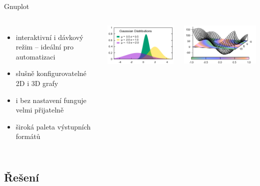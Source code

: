 \documentclass{beamer}
\begin{document}
\begin{frame}{Gnuplot}
  \begin{columns}
      \begin{itemize}
        \item interaktivní i dávkový režim -- ideální pro automatizaci
        \item slušně konfigurovatelné 2D i 3D grafy
        \item i bez nastavení funguje velmi přijatelně
        \item široká paleta výstupních formátů
      \end{itemize}
      \includegraphics[width=\columnwidth]{gnuplot1}

      \includegraphics[width=\columnwidth]{gnuplot2}
  \end{columns}
\end{frame}

\subsection{Řešení}
\end{document}
